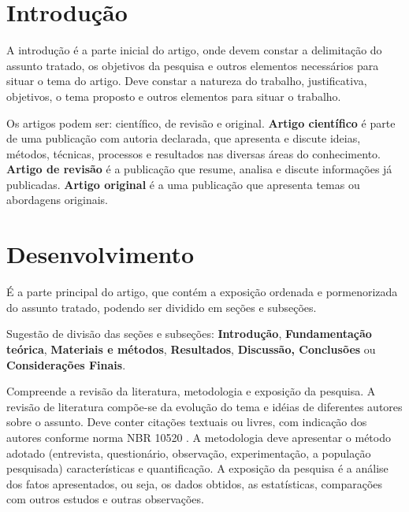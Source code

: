\documentclass[
	article,			%
	12pt,				%
	oneside,			%
	a4paper,			%
	english,			%
	brazil,				%
	sumario=tradicional
]{abntex2}
\begin{document}
\textual

\section{Introdução}

A introdução é a parte inicial do artigo, onde devem constar a delimitação do assunto tratado, os objetivos da pesquisa e outros elementos necessários para situar o tema do artigo. Deve constar a natureza do trabalho, justificativa, objetivos, o tema proposto e outros elementos para situar o trabalho. 

Os artigos podem ser: científico, de revisão e original. \textbf{Artigo científico} é parte de  uma publicação com autoria declarada, que apresenta e discute ideias, métodos, técnicas, processos e resultados nas diversas áreas do conhecimento. \textbf{Artigo de revisão} é a publicação que resume, analisa e discute  informações já publicadas. \textbf{Artigo original} é a uma publicação que apresenta temas ou abordagens originais. 

\section{Desenvolvimento}

É a parte principal do artigo, que contém a exposição ordenada e pormenorizada do assunto tratado, podendo ser dividido em seções e subseções.

Sugestão de divisão das seções e subseções: \textbf{Introdução}, \textbf{Fundamentação teórica}, \textbf{Materiais e métodos}, \textbf{Resultados}, \textbf{Discussão, Conclusões} ou \textbf{Considerações Finais}.

Compreende a revisão da literatura, metodologia e exposição da pesquisa. A revisão de literatura compõe-se da evolução do tema e idéias de diferentes autores sobre o assunto. Deve conter citações textuais ou livres, com indicação dos autores conforme norma NBR 10520 \cite{NBR10520:2002}. A metodologia deve apresentar o método adotado (entrevista, questionário, observação, experimentação, a população pesquisada) características e quantificação. A exposição da pesquisa é a análise dos fatos apresentados, ou seja, os dados obtidos, as estatísticas, comparações com outros estudos e outras observações. 
\end{document}
